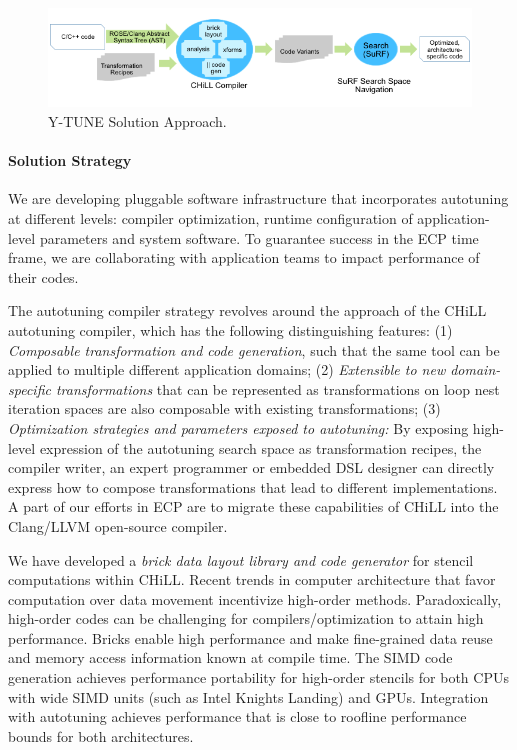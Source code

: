 \begin{figure}[h]
\begin{center}
\includegraphics[width=.8\textwidth]{projects/2.3.2-Tools/2.3.2.07-Autotuning/YTune-solution.png}
\end{center}
\caption{Y-TUNE Solution Approach.}
\end{figure}

\paragraph{Solution Strategy}
We are developing pluggable software infrastructure that incorporates
autotuning at different levels: compiler optimization, runtime configuration of application-level parameters and system software.  
To guarantee success in the ECP time frame, we are collaborating with 
application teams to impact performance of their codes.   

The autotuning compiler strategy revolves around the approach of the 
CHiLL autotuning compiler, which has the following distinguishing
features:
(1) \textit{Composable transformation and code generation}, such
that the same tool can be applied 
to multiple different application domains; 
(2) \textit{Extensible to new domain-specific transformations} that can be represented as transformations on loop nest iteration spaces are also
composable with existing transformations;
(3) \textit{Optimization strategies and parameters exposed to autotuning:} 
By exposing high-level expression 
of the autotuning search space as transformation recipes, the compiler writer, an expert programmer or embedded DSL designer can directly express how to compose
 transformations that lead to different implementations.  
A part of our efforts in ECP are to migrate these capabilities of CHiLL
into the Clang/LLVM open-source compiler.

We have developed a \textit{brick data layout library and code generator} for 
stencil computations within CHiLL.
Recent trends in computer architecture that favor computation over data movement incentivize high-order methods.  Paradoxically, high-order codes can be challenging for compilers/optimization to attain high performance.  Bricks enable high performance and make fine-grained data reuse and memory access information known at compile time.  The SIMD code generation achieves performance portability
for high-order stencils for both CPUs with wide SIMD units (such as Intel Knights Landing) and GPUs.  Integration with autotuning achieves performance that
is close to roofline performance bounds for both architectures.


